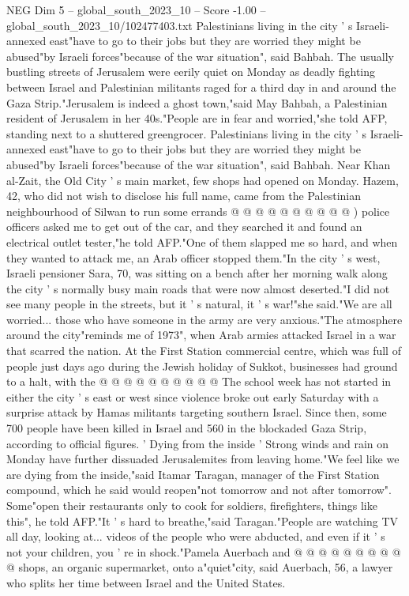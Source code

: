 \begin{textsample}{NEG Dim 5 – global\_south\_2023\_10 – Score -1.00 – global\_south\_2023\_10/102477403.txt}  \label{ex:f5_neg_062}
Palestinians living in the city ' s Israeli-annexed east"have to go to their jobs but they are worried they might be abused"by Israeli forces"because of the war situation", said Bahbah.
The usually bustling streets of Jerusalem were eerily quiet on Monday as deadly fighting between Israel and Palestinian militants raged for a third day in and around the Gaza Strip."Jerusalem is indeed a ghost town,"said May Bahbah, a Palestinian resident of Jerusalem in her 40s."People are in fear and worried,"she told AFP, standing next to a shuttered greengrocer.
Palestinians living in the city ' s Israeli-annexed east"have to go to their jobs but they are worried they might be abused"by Israeli forces"because of the war situation", said Bahbah.
Near Khan al-Zait, the Old City ' s main market, few shops had opened on Monday.
Hazem, 42, who did not wish to disclose his full name, came from the Palestinian neighbourhood of Silwan to run some errands @ @ @ @ @ @ @ @ @ @ ) police officers asked me to get out of the car, and they searched it and found an electrical outlet tester,"he told AFP."One of them slapped me so hard, and when they wanted to attack me, an Arab officer stopped them."In the city ' s west, Israeli pensioner Sara, 70, was sitting on a bench after her morning walk along the city ' s normally busy main roads that were now almost deserted."I did not see many people in the streets, but it ' s natural, it ' s war!"she said."We are all worried... those who have someone in the army are very anxious."The atmosphere around the city"reminds me of 1973", when Arab armies attacked Israel in a war that scarred the nation.
At the First Station commercial centre, which was full of people just days ago during the Jewish holiday of Sukkot, businesses had ground to a halt, with the @ @ @ @ @ @ @ @ @ @ The school week has not started in either the city ' s east or west since violence broke out early Saturday with a surprise attack by Hamas militants targeting southern Israel.
Since then, some 700 people have been killed in Israel and 560 in the blockaded Gaza Strip, according to official figures. ' Dying from the inside ' Strong winds and rain on Monday have further dissuaded Jerusalemites from leaving home."We feel like we are dying from the inside,"said Itamar Taragan, manager of the First Station compound, which he said would reopen"not tomorrow and not after tomorrow".
Some"open their restaurants only to cook for soldiers, firefighters, things like this", he told AFP."It ' s hard to breathe,"said Taragan."People are watching TV all day, looking at... videos of the people who were abducted, and even if it ' s not your children, you ' re in shock."Pamela Auerbach and @ @ @ @ @ @ @ @ @ @ shops, an organic supermarket, onto a"quiet"city, said Auerbach, 56, a lawyer who splits her time between Israel and the United States.

\end{textsample}
